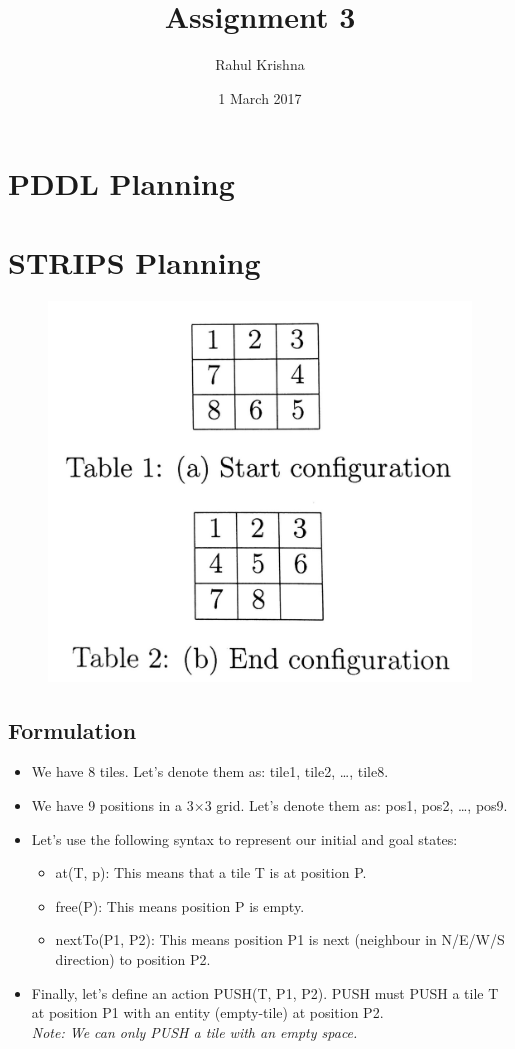 \documentclass{article}
\title{Assignment 3}
\author{Rahul Krishna}
\date{1 March 2017}
\begin{document}
\maketitle
\section{PDDL Planning}
\newpage

\section{STRIPS Planning}
\begin{figure}[!h]
\centering
\includegraphics[width=0.33\linewidth]{assign2_q2.jpg}
\end{figure}
\subsection{Formulation}
\begin{itemize}
    \item We have 8 tiles. Let's denote them as: tile1, tile2, \ldots, tile8.
    \item We have 9 positions in a 3$\times$3 grid. Let's denote them as: pos1, pos2, \ldots, pos9.
    \item Let's use the following syntax to represent our initial and goal states:
    \begin{itemize}
        \item at(T, p): This means that a tile T is at position P.
        \item free(P): This means position P is empty.
        \item nextTo(P1, P2): This means position P1 is next (neighbour in N/E/W/S direction) to position P2.
    \end{itemize}
    \item Finally, let's define an action PUSH(T, P1, P2). PUSH must PUSH a tile T at position P1 with an entity (empty-tile) at position P2.\\ \textit{Note: We can only PUSH a tile with an empty space.}
\end{itemize}
\end{document}
